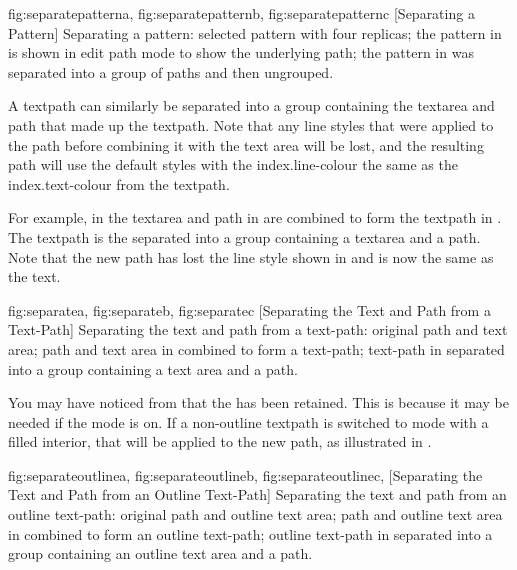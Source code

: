 {
  {fig:separatepatterna}{}{},
  {fig:separatepatternb}{}{},
  {fig:separatepatternc}{}{}
}
[Separating a Pattern]
{Separating a pattern:
 selected pattern with four
replicas;
 the pattern in 
is shown in edit path mode to show the underlying path;
 the pattern in 
was separated into a group of paths and then ungrouped.}

A \gls{textpath} can similarly be separated into a group containing the
\gls{textarea} and \gls{path} that made up the \gls*{textpath}.
Note that any line styles that were applied to the path before
combining it with the text area will be lost, and the resulting
path will use the default styles with the \gls{index.line-colour} the same
as the \gls{index.text-colour} from the \gls*{textpath}.

For example, in  the \gls*{textarea} and
\gls*{path} in  are combined to
form the \gls*{textpath} in . The
\gls*{textpath} is the separated into a group containing a
\gls*{textarea} and a \gls*{path}. Note that the new path has
lost the line style shown in 
and is now the same  as the text.

{
  {fig:separatea}{}{},
  {fig:separateb}{}{},
  {fig:separatec}{}{}
}
[Separating the Text and Path from a Text-Path]
{Separating the text and path from a text-path: 
 original path and text area;
 path and text area 
in  combined to form a text-path;
 text-path 
in  separated into
a group containing a text area and a path.}

You may have noticed from  that the 
 has been retained. This is because it may be needed if the
 mode is on.  If a non-outline \gls{textpath} is switched to
 mode with a filled interior, that  will be applied
to the new \gls{path}, as illustrated in .

{
  {fig:separateoutlinea}{}{},
  {fig:separateoutlineb}{}{},
  {fig:separateoutlinec}{}{},
}
[Separating the Text and Path from an Outline Text-Path]
{Separating the text and path from an outline text-path: 
 original path and
outline text area;
 path and outline text area 
in  combined to
form an outline text-path;
 outline text-path in 
 separated into
a group containing an outline text area and a path.}

